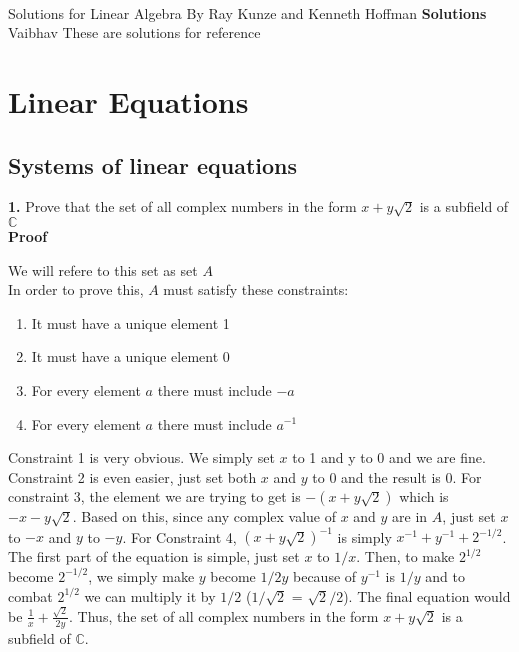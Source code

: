 \documentclass[11pt]{article}
\begin{document}
\thispagestyle{empty}
\bigskip \
\vspace{0.1cm}

\begin{center}
{\fontsize{22}{22} \selectfont Solutions for Linear Algebra By Ray Kunze and Kenneth Hoffman}
\vskip 16pt
{\fontsize{36}{36} \selectfont \bf \sffamily Solutions}
\vskip 24pt
{\fontsize{18}{18} \selectfont \rmfamily Vaibhav} 
\vskip 24pt
These are solutions for reference
\end{center}


\newpage
\microtoc
\newpage

\section{Linear Equations}
\subsection{Systems of linear equations}
\textbf{1.} Prove that the set of all complex numbers in the form $x + y\sqrt{2}$ is a subfield of $\mathbb{C}$\\

\textbf{Proof}

We will refere to this set as set \textbf{$A$}\\

In order to prove this, $A$ must satisfy these constraints:
\begin{enumerate}
  \item{It must have a unique element 1}
  \item{It must have a unique element 0}
  \item{For every element $a$ there must include $-a$}
  \item{For every element $a$ there must include $a^{-1}$}\\
\end{enumerate}

Constraint 1 is very obvious. We simply set $x$ to 1 and y to $0$ and we are fine. Constraint 2 is even easier, just set both $x$ and $y$ to 0 and the result is 0. For constraint 3, the element we are trying to get is $-(x + y\sqrt{2})$ which is $-x-y\sqrt{2}$. Based on this, since any complex value of $x$ and $y$ are in $A$, just set $x$ to $-x$ and $y$ to $-y$. For Constraint 4, $(x + y\sqrt{2})^{-1}$ is simply $x^{-1} + y^{-1} + 2^{-1/2}$. The first part of the equation is simple, just set $x$ to $1/{x}$. Then, to make $2^{1/2}$ become $2^{-1/2}$, we simply make $y$  become $1/2y$ because of $y^{-1}$ is $1/y$ and to combat $2^{1/2}$ we can multiply it by $1/2$ ($1/\sqrt{2}$ = $\sqrt{2}/2$). The final equation would be $\frac{1}{x} + \frac{\sqrt{2}}{2y}$. Thus, the set of all complex numbers in the form $x + y\sqrt{2}$ is a subfield of $\mathbb{C}$.
\\
\end{document}
